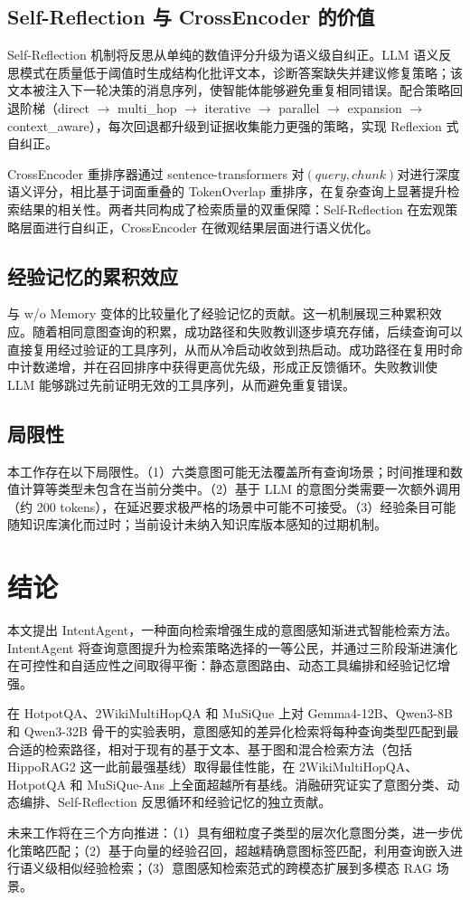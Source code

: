 \documentclass[runningheads]{llncs}
\begin{document}
\subsection{Self-Reflection 与 CrossEncoder 的价值}

Self-Reflection 机制将反思从单纯的数值评分升级为语义级自纠正。LLM 语义反思模式在质量低于阈值时生成结构化批评文本，诊断答案缺失并建议修复策略；该文本被注入下一轮决策的消息序列，使智能体能够避免重复相同错误。配合策略回退阶梯（direct $\to$ multi\_hop $\to$ iterative $\to$ parallel $\to$ expansion $\to$ context\_aware），每次回退都升级到证据收集能力更强的策略，实现 Reflexion 式自纠正。

CrossEncoder 重排序器通过 sentence-transformers 对$(query, chunk)$对进行深度语义评分，相比基于词面重叠的 TokenOverlap 重排序，在复杂查询上显著提升检索结果的相关性。两者共同构成了检索质量的双重保障：Self-Reflection 在宏观策略层面进行自纠正，CrossEncoder 在微观结果层面进行语义优化。

\subsection{经验记忆的累积效应}

与 w/o Memory 变体的比较量化了经验记忆的贡献。这一机制展现三种累积效应。随着相同意图查询的积累，成功路径和失败教训逐步填充存储，后续查询可以直接复用经过验证的工具序列，从而从冷启动收敛到热启动。成功路径在复用时命中计数递增，并在召回排序中获得更高优先级，形成正反馈循环。失败教训使 LLM 能够跳过先前证明无效的工具序列，从而避免重复错误。

\subsection{局限性}

本工作存在以下局限性。（1）六类意图可能无法覆盖所有查询场景；时间推理和数值计算等类型未包含在当前分类中。（2）基于 LLM 的意图分类需要一次额外调用（约 200 tokens），在延迟要求极严格的场景中可能不可接受。（3）经验条目可能随知识库演化而过时；当前设计未纳入知识库版本感知的过期机制。

\section{结论}

本文提出 IntentAgent，一种面向检索增强生成的意图感知渐进式智能检索方法。IntentAgent 将查询意图提升为检索策略选择的一等公民，并通过三阶段渐进演化在可控性和自适应性之间取得平衡：静态意图路由、动态工具编排和经验记忆增强。

在 HotpotQA、2WikiMultiHopQA 和 MuSiQue 上对 Gemma4-12B、Qwen3-8B 和 Qwen3-32B 骨干的实验表明，意图感知的差异化检索将每种查询类型匹配到最合适的检索路径，相对于现有的基于文本、基于图和混合检索方法（包括 HippoRAG2 这一此前最强基线）取得最佳性能，在 2WikiMultiHopQA、HotpotQA 和 MuSiQue-Ans 上全面超越所有基线。消融研究证实了意图分类、动态编排、Self-Reflection 反思循环和经验记忆的独立贡献。

未来工作将在三个方向推进：（1）具有细粒度子类型的层次化意图分类，进一步优化策略匹配；（2）基于向量的经验召回，超越精确意图标签匹配，利用查询嵌入进行语义级相似经验检索；（3）意图感知检索范式的跨模态扩展到多模态 RAG 场景。



\end{document}

